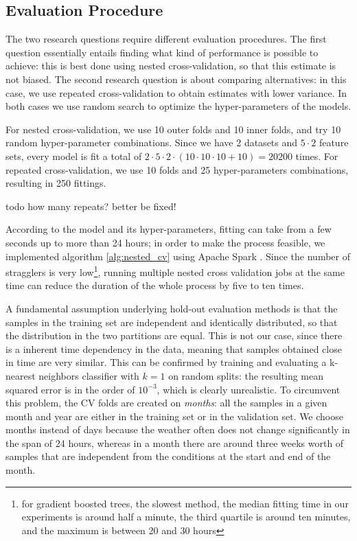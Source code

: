 \documentclass[a4paper]{book}
\begin{document}
\subsection{Evaluation Procedure}
The two research questions require different evaluation procedures. The first question essentially entails finding what kind of performance is possible to achieve: this is best done using nested cross-validation, so that this estimate is not biased. The second research question is about comparing alternatives: in this case, we use repeated cross-validation to obtain estimates with lower variance. In both cases we use random search \citep{random_search} to optimize the hyper-parameters of the models.

For nested cross-validation, we use 10 outer folds and 10 inner folds, and try 10 random hyper-parameter combinations. Since we have 2 datasets and $5\cdot2$ feature sets, every model is fit a total of $2\cdot5\cdot2\cdot(10\cdot10\cdot10+10)=20200$ times. For repeated cross-validation, we use 10 folds and 25 hyper-parameters combinations, resulting in 250 fittings.

todo how many repeats? better be fixed!

According to the model and its hyper-parameters, fitting can take from a few seconds up to more than 24 hours; in order to make the process feasible, we implemented algorithm \ref{alg:nested_cv} using Apache Spark \citep{spark}. Since the number of stragglers is very low\footnote{for gradient boosted trees, the slowest method, the median fitting time in our experiments is around half a minute, the third quartile is around ten minutes, and the maximum is between 20 and 30 hours}, running multiple nested cross validation jobs at the same time can reduce the duration of the whole process by five to ten times.

A fundamental assumption underlying hold-out evaluation methods is that the samples in the training set are independent and identically distributed, so that the distribution in the two partitions are equal. This is not our case, since there is a inherent time dependency in the data, meaning that samples obtained close in time are very similar. This can be confirmed by training and evaluating a k-nearest neighbors classifier with $k=1$ on random splits: the resulting mean squared error is in the order of $10^{-3}$, which is clearly unrealistic. To circumvent this problem, the CV folds are created on \emph{months}: all the samples in a given month and year are either in the training set or in the validation set. We choose months instead of days because the weather often does not change significantly in the span of 24 hours, whereas in a month there are around three weeks worth of samples that are independent from the conditions at the start and end of the month.
\end{document}
